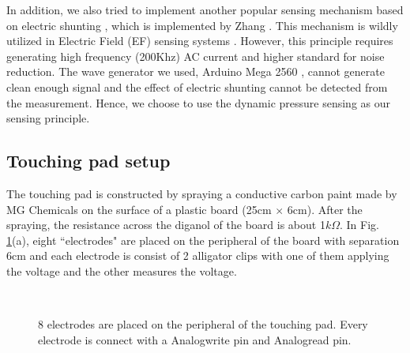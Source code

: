 \documentclass[reprint,amsmath, amsfonts, amssymb, aps, letterpaper]{revtex4-1}
\begin{document}
In addition, we also tried to implement another popular sensing mechanism based on electric shunting \cite{shunt}, which is implemented by Zhang \cite{electrick}. This mechanism is wildly utilized in Electric Field (EF) sensing systems \cite{ef}. However, this principle requires generating high frequency (200Khz) AC current and higher standard for noise reduction. The wave generator we used, Arduino Mega 2560 \citep{arduino}, cannot generate clean enough signal and the effect of electric shunting cannot be detected from the measurement. Hence, we choose to use the dynamic pressure sensing as our sensing principle.
\subsection{Touching pad setup}
The touching pad is constructed by spraying a conductive carbon paint made by MG Chemicals \citep{carbon} on the surface of a plastic board (25cm $\times$ 6cm). After the spraying, the resistance across the diganol of the board is about 1$\si{k \Omega}$. In Fig. \ref{fig::pad}(a), eight ``electrodes" are placed on the peripheral of the board with separation 6cm and each electrode is consist of 2 alligator clips with one of them applying the voltage and the other measures the voltage. 

\begin{figure}
 	\\
\caption{8 electrodes are placed on the peripheral of the touching pad. Every electrode is connect with a Analogwrite pin and Analogread pin.}
 \label{fig::pad}
\end{figure}
\end{document}
